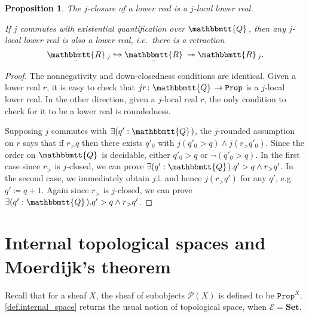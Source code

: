 \documentclass[11pt, oneside, article]{memoir}
\theoremstyle{plain}
\newtheorem{proposition}[theorem]{Proposition}
\theoremstyle{definition}
\theoremstyle{remark}
\newcommand{\const}[1]{\mathtt{#1}}
\newcommand{\cat}[1]{\mathcal{#1}}
\newcommand{\Cat}[1]{\mathbf{#1}}
\newcommand{\smset}{\Cat{Set}}
\newcommand{\surj}{\twoheadrightarrow}
\newcommand{\inj}{\hookrightarrow}
\newcommand{\ubar}[1]{\underaccent{\bar}{#1}}
\newcommand{\internal}[1]{\raisebox{-.03ex}{$\mathbbmtt{#1}$}}
\newcommand{\hs}{\hspace{1.1pt}}
\newcommand{\tqq}{\internal{Q}\hs}
\newcommand{\trr}{\internal{R}\hs}
\newcommand{\tlrr}{\ubar{\trr}\hs}
\newcommand{\pow}{\mathcal{P}}
\newcommand{\prop}{\const{Prop}}
\begin{document}
\begin{proposition}
The $j$-closure of a lower real is a $j$-local lower real.

If $j$ commutes with existential quantification over $\tqq$, then any $j$-local lower real is also a lower real, i.e.\ there is a retraction
\[
  \tlrr_j\inj\tlrr\surj\tlrr_j.
\]
\end{proposition}
\begin{proof}
The nonnegativity and down-closedness conditions are identical. Given a lower real $r$, it is easy to check that $jr\colon\tqq\to\prop$ is a $j$-local lower real. In the other direction, given a $j$-local real $r$, the only condition to check for it to be a lower real is roundedness. 

Supposing $j$ commutes with $\exists(q':\tqq)$, the $j$-rounded assumption on $r$ says that if $r_>q$ then there exists $q'_0$ with $j(q'_0>q)\wedge j(r_>q'_0)$. Since the order on $\tqq$ is decidable, either $q'_0>q$ or $\neg(q'_0>q)$. In the first case since $r_>$ is $j$-closed, we can prove $\exists (q':\tqq).q'>q\wedge r_>q'$. In the second case, we immediately obtain $j\bot$ and hence $j(r_>q')$ for any $q'$, e.g.\ $q'\coloneqq q+1$. Again since $r_>$ is $j$-closed, we can prove $\exists (q':\tqq).q'>q\wedge r_>q'$.
\end{proof}

\section{Internal topological spaces and Moerdijk's theorem}


Recall that for a sheaf $X$, the sheaf of subobjects $\pow(X)$ is defined to be $\prop^X$. \cref{def.internal_space} returns the usual notion of topological space, when $\cat{E}=\smset$.
\end{document}
